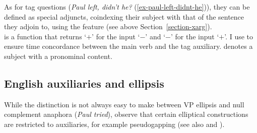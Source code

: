 \eal
{}
\zl

As for tag questions (\emph{Paul left, didn't he?} (\ref{ex-paul-left-didnt-he})), they can be defined as special adjuncts, coindexing their subject with that of the sentence they adjoin to, using the \xarg feature (see above Section~\ref{section-xarg}).
\ea
{} \impl\\
\z
{} is a function that returns `$+$' for the input `$-$' and `$-$' for the input `$+$'. I use  to ensure time concordance between the main verb and the tag auxiliary.  denotes a subject with a pronominal content.

\subsection{English auxiliaries and ellipsis}

While the distinction is not always easy to make between VP ellipsis and null complement anaphora
(\emph{Paul tried}), \citeauthor{Sagetal2020} observe that certain elliptical constructions are
restricted to auxiliaries, for example pseudogapping (see also
 and
\citealt{Miller2014a-u}).

\eal
{}
\zl

